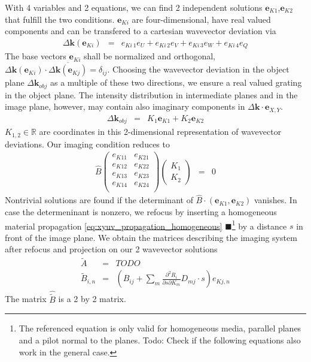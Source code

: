 \documentclass[12pt,a4paper,twoside,openright,BCOR10mm,headsepline,titlepage,abstracton,chapterprefix,final]{scrreprt}
\newcommand\Vector[1]{{\mathbf{#1}}}
\newcommand\wavenumber{k}
\newcommand\Wavevector{\Vector{\wavenumber}}
\newcommand{\remark}[1]{{\color{red}$\blacksquare$}\footnote{{\color{red}#1}}}
\begin{document}
With 4 variables and 2 equations, we can find 2 independent solutions $\Vector{e}_{K1}$,$\Vector{e}_{K2}$ that fulfill the two conditions.
$\Vector{e}_{Ki}$ are four-dimensional, have real valued components and can be transfered to a cartesian wavevector deviation via
\begin{eqnarray}
 \Delta \Wavevector(\Vector{e}_{Ki}) &=& e_{Ki\,1} e_{U} + e_{Ki\,2} e_{V} + e_{Ki\,3} e_{W} + e_{Ki\,4} e_{Q}
\end{eqnarray}
The base vectors $\Vector{e}_{Ki}$ shall be normalized and orthogonal, 
$\Delta \Wavevector(\Vector{e}_{Ki}) \cdot \overline{\Delta \Wavevector (\Vector{e}_{Kj})} = \delta_{ij}$.
Choosing the wavevector deviation in the object plane $\Delta \Wavevector_{obj}$ as a multiple of these two directions,
we ensure a real valued grating in the object plane. 
The intensity distribution in intermediate planes and in the image plane, however, 
may contain also imaginary components in $\Delta \Wavevector \cdot \Vector{e}_{X,Y}$.
\begin{eqnarray}
 \Delta \Wavevector_{obj} &=& K_1 \Vector{e}_{K1} + K_2 \Vector{e}_{K2} \label{eq:deltaK_as_kappa}
\end{eqnarray}
$K_{1,2} \in \mathbb{R}$ are coordinates in this 2-dimensional representation of wavevector deviations.
Our imaging condition reduces to
\begin{eqnarray}
 \hat{B}
 \begin{pmatrix}
 e_{K11} & e_{K21} \\
 e_{K12} & e_{K22} \\
 e_{K13} & e_{K23} \\
 e_{K14} & e_{K24} \\ 
 \end{pmatrix}
 \begin{pmatrix}
 K_1 \\ K_2 
 \end{pmatrix}
 &=& 0
\end{eqnarray}
Nontrivial solutions are found if the determinant of $\hat{B} \cdot(\Vector{e}_{K1}, \Vector{e}_{K2})$ vanishes.
In case the determeninant is nonzero, 
we refocus by inserting a homogeneous material propagation \eqref{eq:xyuv_propagation_homogeneous} 
\remark{The referenced equation is only valid for homogeneous media, parallel planes and a pilot normal to the planes. Todo: Check if the following equations also work in the general case.} 
by a distance $s$ 
in front of the image plane.
We obtain the matrices describing the imaging system after refocus and projection on our 2 wavevector solutions
\begin{eqnarray}
 \tilde{A} &=& TODO \\
 \tilde{B}_{i,n} &=& \left( B_{ij} + \sum_m \frac{\partial^2 R_i}{\partial s \partial K_m} D_{mj} \cdot s \right) e_{Kj,n} \label{eq:tildeB}
\end{eqnarray}
The matrix $\hat{\tilde{B}}$ is a 2 by 2 matrix.
\end{document}
